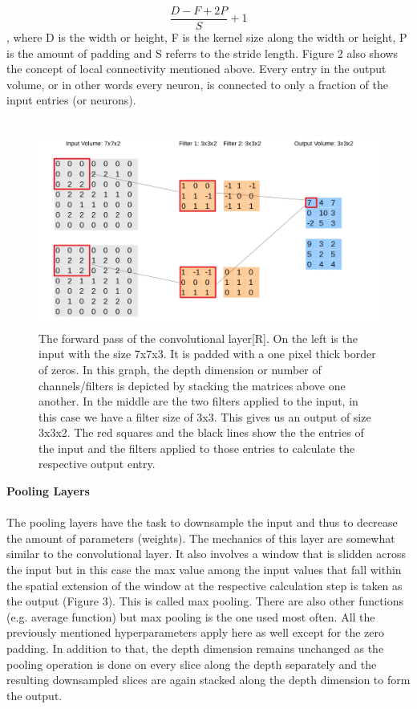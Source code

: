 \documentclass{article}
\begin{document}
\[
\frac{D-F+2P}{S}+1
\]
, where D is the width or height, F is the kernel size along the width or height, P is the amount of padding and S referrs to the stride length. Figure 2 also shows the concept of local connectivity mentioned above. Every entry in the output volume, or in other words every neuron, is connected to only a fraction of the input entries (or neurons).\\\\
\begin{figure}[H]
\begin{center}
\includegraphics[scale=0.25]{CNN_forward}
\end{center}
\caption{The forward pass of the convolutional layer[R]. On the left is the input with the size 7x7x3. It is padded with a one pixel thick border of zeros. In this graph, the depth dimension or number of channels/filters is depicted by stacking the matrices above one another. In the middle are the two filters applied to the input, in this case we have a filter size of 3x3. This gives us an output of size 3x3x2. The red squares and the black lines show the the entries of the input and the filters applied to those entries to calculate the respective output entry. }
\end{figure}
\textbf{Pooling Layers}\\\\
The pooling layers have the task to downsample the input and thus to decrease the amount of parameters (weights). The mechanics of this layer are somewhat similar to the convolutional layer. It also involves a window that is slidden across the input but in this case the max value among the input values that fall within the spatial extension of the window at the respective calculation step is taken as the output (Figure 3). This is called max pooling. There are also other functions (e.g. average function) but max pooling is the one used most often. All the previously mentioned hyperparameters apply here as well except for the zero padding. In addition to that, the depth dimension remains unchanged as the pooling operation is done on every slice along the depth separately and the resulting downsampled slices are again stacked along the depth dimension to form the output.
\end{document}
